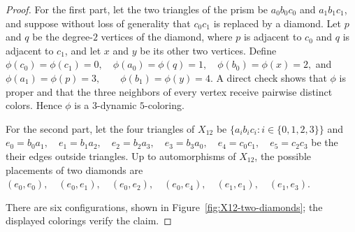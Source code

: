 \documentclass[10pt,a4paper]{article}
\theoremstyle{case}
\numberwithin{subcase}{case}
\begin{document}
\begin{proof}
For the first part, 
let the two triangles of the prism be
$a_0b_0c_0$ and $a_1b_1c_1$, and suppose without loss of generality that $c_0c_1$ is replaced
by a diamond. Let $p$ and $q$ be the degree-$2$ vertices of the diamond,
where $p$ is adjacent to $c_0$ and $q$ is adjacent to $c_1$, and let
$x$ and $y$ be its other two vertices. Define
$
\phi(c_0)=\phi(c_1)=0,\quad
\phi(a_0)=\phi(q)=1,\quad
\phi(b_0)=\phi(x)=2,
$
and
$
\phi(a_1)=\phi(p)=3,\qquad
\phi(b_1)=\phi(y)=4.
$
A direct check shows that $\phi$ is proper and that the three neighbors
of every vertex receive pairwise distinct colors. Hence $\phi$ is a
$3$-dynamic $5$-coloring.

For the second part, let
the four triangles of $X_{12}$ be 
$\{a_ib_ic_i: i\in \{0,1,2,3\}\}$ and
$
e_0=b_0a_1,\quad e_1=b_1a_2,\quad
e_2=b_2a_3,\quad e_3=b_3a_0,\quad
e_4=c_0c_1,\quad e_5=c_2c_3
$
be the their edges outside triangles. Up to automorphisms of $X_{12}$, the
possible placements of two diamonds are
$
(e_0,e_0),\quad (e_0,e_1),\quad (e_0,e_2),\quad
(e_0,e_4),\quad (e_1,e_1),\quad (e_1,e_3).
$

There are six configurations, shown in
Figure~\ref{fig:X12-two-diamonds}; the displayed colorings verify the claim.
\end{proof}



\def\Xcfdiamond#1#2#3#4#5{%
  \node[Xcf vertex,
    label={[Xcf label]#4:{$#5$}}]
  (#1) at (#2,#3) {};
}
\end{document}
